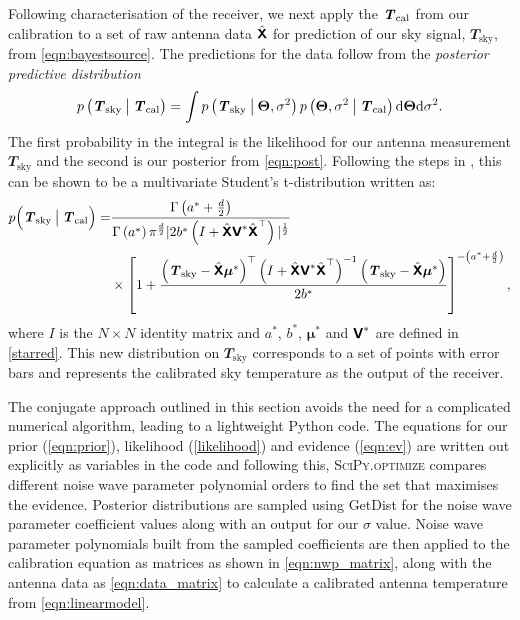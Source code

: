 Following characterisation of the receiver, we next apply the $\y$ from our calibration to a set of raw antenna data $\hat{\mathbfss{X}}$ for prediction of our sky signal, $\mathbfit{T}_{\mathrm{sky}}$, from \cref{eqn:bayestsource}. The predictions for the data follow from the \emph{posterior predictive distribution}
\begin{equation}
    p\left(\mathbfit{T}_{\mathrm{sky}} \given[\big] \mathbfit{T}_{\mathrm{cal}} \right) = \int p\left( \mathbfit{T}_{\mathrm{sky}} \given[\big] \boldsymbol{\Theta},\sigma^2 \right) p \left( \boldsymbol{\Theta},\sigma^2 \given[\big] \mathbfit{T}_{\mathrm{cal}} \right) \mathrm{d}\boldsymbol{\Theta}\mathrm{d}\sigma^2.
\end{equation}
The first probability in the integral is the likelihood for our antenna measurement $\mathbfit{T}_{\mathrm{sky}}$ and the second is our posterior from \cref{eqn:post}. Following the steps in \citet{banerjee}, this can be shown to be a multivariate Student's t-distribution written as:
\begin{equation}\label{eqn:predictive}
    \begin{aligned}
    p\Big(\mathbfit{T}_{\mathrm{sky}} \given[\big] \mathbfit{T}_{\mathrm{cal}} \Big) = &\frac{\Gamma\left( a^* + \frac{d}{2} \right)}{\Gamma\left( a^* \right)\pi^{\frac{d}{2}}|2b^*\left( I + \hat{\mathbfss{X}}\mathbfss{V}^*\hat{\mathbfss{X}}^{\top}\right)|^{\frac{1}{2}}}
    \\ & \times
    \left[ 1 + \frac{\left( \mathbfit{T}_{\mathrm{sky}} - \hat{\mathbfss{X}}\boldsymbol{\mu}^* \right)^{\top} \left( I + \hat{\mathbfss{X}}\mathbfss{V}^*\hat{\mathbfss{X}}^{\top} \right)^{-1} \left( \mathbfit{T}_{\mathrm{sky}} - \hat{\mathbfss{X}}\boldsymbol{\mu}^* \right)}{2b^*} \right]^{-\left( a^* + \frac{d}{2} \right)},
    \end{aligned}
\end{equation}
where $I$ is the $N \times N$ identity matrix and $a^*$, $b^*$, $\boldsymbol{\mu}^*$ and $\mathbfss{V}^*$ are defined in \cref{starred}. This new distribution on $\mathbfit{T}_{\mathrm{sky}}$ corresponds to a set of points with error bars and represents the calibrated sky temperature as the output of the receiver.

The conjugate approach outlined in this section avoids the need for a complicated numerical algorithm, leading to a lightweight Python code. The equations for our prior (\cref{eqn:prior}), likelihood (\cref{likelihood}) and evidence (\cref{eqn:ev}) are written out explicitly as variables in the code and following this, \textsc{SciPy.optimize} compares different noise wave parameter polynomial orders to find the set that maximises the evidence. Posterior distributions are sampled using GetDist \citep{getdist} for the noise wave parameter coefficient values along with an output for our $\sigma$ value. Noise wave parameter polynomials built from the sampled coefficients are then applied to the calibration equation as matrices as shown in \cref{eqn:nwp_matrix}, along with the antenna data as \cref{eqn:data_matrix} to calculate a calibrated antenna temperature from \cref{eqn:linearmodel}.
